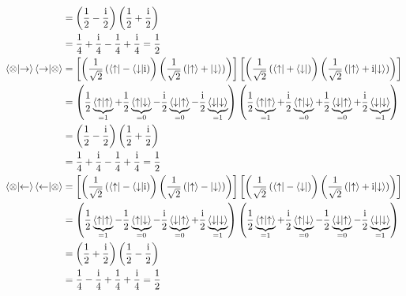 \begin{align*}
    &= \left( \frac{1}{2} - \frac{\text{i}}{2} \right) \left( \frac{1}{2} + \frac{\text{i}}{2} \right)\\
    &= \frac{1}{4} + \frac{\text{i}}{4} - \frac{1}{4} + \frac{\text{i}}{4} = \frac{1}{2}\\
        \braket{\otimes}{\to}\braket{\to}{\otimes} &=
    \left[ \left( \frac{1}{\sqrt{2}}\left(\langle\uparrow\rvert-\langle\downarrow\rvert\text{i}\right) \right) 
    \left( \frac{1}{\sqrt{2}}\left(\lvert\uparrow\rangle+\lvert\downarrow\rangle\right) \right) \right] 
    \left[ \left( \frac{1}{\sqrt{2}}\left(\langle\uparrow\rvert+\langle\downarrow\rvert\right) \right) 
    \left( \frac{1}{\sqrt{2}}\left(\lvert\uparrow\rangle+\text{i}\lvert\downarrow\rangle\right) \right) \right]\\
    &= \left( \frac{1}{2} \underbrace{\braket{\uparrow}{\uparrow}}_{=1} 
    + \frac{1}{2} \underbrace{\braket{\uparrow}{\downarrow}}_{=0}
    - \frac{\text{i}}{2} \underbrace{\braket{\downarrow}{\uparrow}}_{=0} 
    - \frac{\text{i}}{2} \underbrace{\braket{\downarrow}{\downarrow}}_{=1} \right)
    \left( \frac{1}{2} \underbrace{\braket{\uparrow}{\uparrow}}_{=1} 
    + \frac{\text{i}}{2} \underbrace{\braket{\uparrow}{\downarrow}}_{=0}
    + \frac{1}{2} \underbrace{\braket{\downarrow}{\uparrow}}_{=0} 
    + \frac{\text{i}}{2} \underbrace{\braket{\downarrow}{\downarrow}}_{=1} \right)\\
    &= \left( \frac{1}{2} - \frac{\text{i}}{2} \right) \left( \frac{1}{2} + \frac{\text{i}}{2} \right)\\
    &= \frac{1}{4} + \frac{\text{i}}{4} - \frac{1}{4} + \frac{\text{i}}{4} = \frac{1}{2}\\
        \braket{\otimes}{\leftarrow}\braket{\leftarrow}{\otimes} &=
    \left[ \left( \frac{1}{\sqrt{2}}\left(\langle\uparrow\rvert-\langle\downarrow\rvert\text{i}\right) \right) 
    \left( \frac{1}{\sqrt{2}}\left(\lvert\uparrow\rangle-\lvert\downarrow\rangle\right) \right) \right] 
    \left[ \left( \frac{1}{\sqrt{2}}\left(\langle\uparrow\rvert-\langle\downarrow\rvert\right) \right) 
    \left( \frac{1}{\sqrt{2}}\left(\lvert\uparrow\rangle+\text{i}\lvert\downarrow\rangle\right) \right) \right]\\
    &= \left( \frac{1}{2} \underbrace{\braket{\uparrow}{\uparrow}}_{=1} 
    - \frac{1}{2} \underbrace{\braket{\uparrow}{\downarrow}}_{=0}
    - \frac{\text{i}}{2} \underbrace{\braket{\downarrow}{\uparrow}}_{=0} 
    + \frac{\text{i}}{2} \underbrace{\braket{\downarrow}{\downarrow}}_{=1} \right)
    \left( \frac{1}{2} \underbrace{\braket{\uparrow}{\uparrow}}_{=1} 
    + \frac{\text{i}}{2} \underbrace{\braket{\uparrow}{\downarrow}}_{=0}
    - \frac{1}{2} \underbrace{\braket{\downarrow}{\uparrow}}_{=0} 
    - \frac{\text{i}}{2} \underbrace{\braket{\downarrow}{\downarrow}}_{=1} \right)\\
    &= \left( \frac{1}{2} + \frac{\text{i}}{2} \right) \left( \frac{1}{2} - \frac{\text{i}}{2} \right)\\
    &= \frac{1}{4} - \frac{\text{i}}{4} + \frac{1}{4} + \frac{\text{i}}{4} = \frac{1}{2}
    \end{align*}

